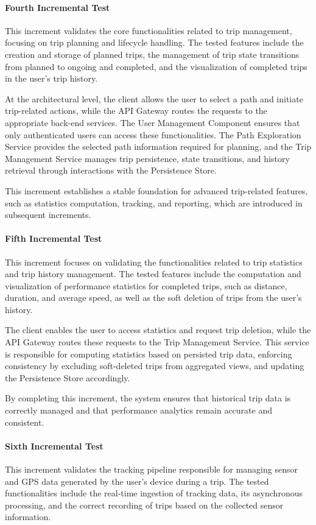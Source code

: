 \paragraph{Fourth Incremental Test}
This increment validates the core functionalities related to trip management, focusing on trip planning and lifecycle handling. The tested features include the creation and storage of planned trips, the management of trip state transitions from planned to ongoing and completed, and the visualization of completed trips in the user’s trip history.

At the architectural level, the client allows the user to select a path and initiate trip-related actions, while the API Gateway routes the requests to the appropriate back-end services. The User Management Component ensures that only authenticated users can access these functionalities. The Path Exploration Service provides the selected path information required for planning, and the Trip Management Service manages trip persistence, state transitions, and history retrieval through interactions with the Persistence Store.

This increment establishes a stable foundation for advanced trip-related features, such as statistics computation, tracking, and reporting, which are introduced in subsequent increments.

\paragraph{Fifth Incremental Test}
This increment focuses on validating the functionalities related to trip statistics and trip history management. The tested features include the computation and visualization of performance statistics for completed trips, such as distance, duration, and average speed, as well as the soft deletion of trips from the user’s history.

The client enables the user to access statistics and request trip deletion, while the API Gateway routes these requests to the Trip Management Service. This service is responsible for computing statistics based on persisted trip data, enforcing consistency by excluding soft-deleted trips from aggregated views, and updating the Persistence Store accordingly.

By completing this increment, the system ensures that historical trip data is correctly managed and that performance analytics remain accurate and consistent.

\paragraph{Sixth Incremental Test}
This increment validates the tracking pipeline responsible for managing sensor and GPS data generated by the user’s device during a trip. The tested functionalities include the real-time ingestion of tracking data, its asynchronous processing, and the correct recording of trips based on the collected sensor information.

